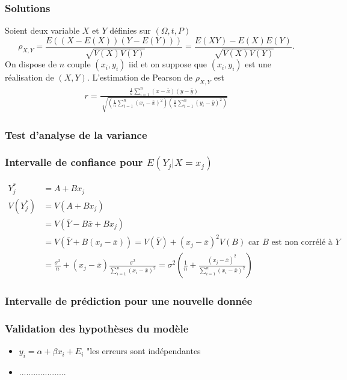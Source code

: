 \documentclass{article}
\theoremstyle{plain}%
\theoremstyle{definition}
\theoremstyle{remark}
\begin{document}
\subsubsection{Solutions}
Soient deux variable $ X $ et $ Y $ définies sur $ (\Omega, t, P) $ 
\[
    \rho _{X,Y} = \frac{E((X - E(X))(Y - E(Y)))}{\sqrt[]{V(X) V(Y)}} = \frac{E(XY) - E(X)E(Y)}{\sqrt[]{V(X)V(Y)}}
.\]
On dispose de $ n $ couple $ (x_i, y_i) $ iid et on suppose que $ (x_i,y_i) $ est une réalisation de $ (X,Y) $. L'estimation de Pearson de $ \rho _{X,Y} $ est
\begin{align*}
    r = \frac{ \frac{1}{n} \sum_{i=1}^{n} (x - \bar{x})(y - \bar{y})}{\sqrt[]{ ( \frac{1}{n} \sum_{i=1}^{n} (x_i - \bar{x})^2) (\frac{1}{n}\sum_{i=1}^{n} (y_i - \bar{y})^2 ) }}
\end{align*}

\subsubsection{Test d'analyse de la variance}
\subsubsection{Intervalle de confiance pour $ E(Y_j | X=x_j) $ }
\begin{align*}
    Y_j^* &= A + Bx_j \\
    V(Y_j^*) &= V(A + Bx_j) \\
            &= V(\bar{Y} - B \bar{x} + Bx_j) \\
            &= V(\bar{Y} + B(x_i - \bar{x})) = V(\bar{Y}) + (x_j - \bar{x})^2 V(B) \text{ car } B \text{ est non corrélé à } Y \\
            &= \frac{\sigma ^2}{n} + (x_j - \bar{x}) \frac{\sigma ^2}{\sum_{i=1}^{n}(x_i - \bar{x})^2} = \sigma ^2 (\frac{1}{n} + \frac{(x_j - \bar{x})^2}{\sum_{i=1}^{n}(x_i - \bar{x})^2})
\end{align*}

\subsubsection{Intervalle de prédiction pour une nouvelle donnée}
\subsubsection{Validation des hypothèses du modèle}
\begin{itemize}
    \item $ y_i = \alpha + \beta x_i + E_i $ "les erreurs sont indépendantes
    \item ....................
\end{itemize}
\end{document}
